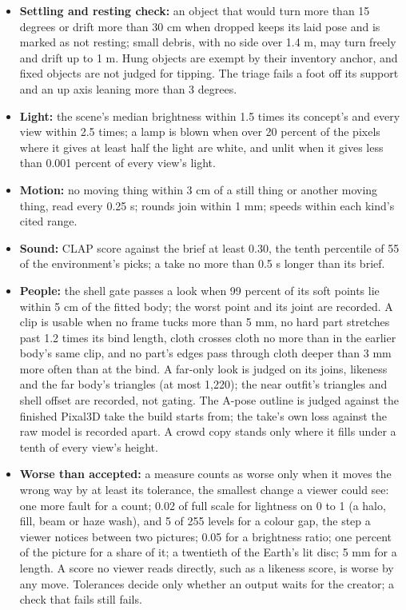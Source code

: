 \begin{itemize}
\item
  \textbf{Settling and resting check:} an object that would turn more than 15 degrees or drift more than 30 cm when dropped keeps its laid pose and is marked as not resting; small debris, with no side over 1.4 m, may turn freely and drift up to 1 m. Hung objects are exempt by their inventory anchor, and fixed objects are not judged for tipping. The triage fails a foot off its support and an up axis leaning more than 3 degrees.
\item
  \textbf{Light:} the scene's median brightness within 1.5 times its concept's and every view within 2.5 times; a lamp is blown when over 20 percent of the pixels where it gives at least half the light are white, and unlit when it gives less than 0.001 percent of every view's light.
\item
  \textbf{Motion:} no moving thing within 3 cm of a still thing or another moving thing, read every 0.25 s; rounds join within 1 mm; speeds within each kind's cited range.
\item
  \textbf{Sound:} CLAP score against the brief at least 0.30, the tenth percentile of 55 of the environment's picks; a take no more than 0.5 s longer than its brief.
\item
  \textbf{People:} the shell gate passes a look when 99 percent of its soft points lie within 5 cm of the fitted body; the worst point and its joint are recorded. A clip is usable when no frame tucks more than 5 mm, no hard part stretches past 1.2 times its bind length, cloth crosses cloth no more than in the earlier body's same clip, and no part's edges pass through cloth deeper than 3 mm more often than at the bind. A far-only look is judged on its joins, likeness and the far body's triangles (at most 1,220); the near outfit's triangles and shell offset are recorded, not gating. The A-pose outline is judged against the finished Pixal3D take the build starts from; the take's own loss against the raw model is recorded apart. A crowd copy stands only where it fills under a tenth of every view's height.
\item
  \textbf{Worse than accepted:} a measure counts as worse only when it moves the wrong way by at least its tolerance, the smallest change a viewer could see: one more fault for a count; 0.02 of full scale for lightness on 0 to 1 (a halo, fill, beam or haze wash), and 5 of 255 levels for a colour gap, the step a viewer notices between two pictures; 0.05 for a brightness ratio; one percent of the picture for a share of it; a twentieth of the Earth's lit disc; 5 mm for a length. A score no viewer reads directly, such as a likeness score, is worse by any move. Tolerances decide only whether an output waits for the creator; a check that fails still fails.

\end{itemize}
